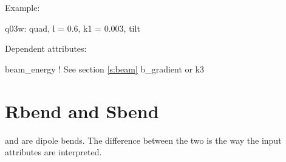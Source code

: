 \vskip0.05in \noindent
Example:
\begin{example}
  q03w: quad, l = 0.6, k1 = 0.003, tilt
\end{example}

\vskip0.05in \noindent
Dependent attributes:
\begin{example}
  beam\_energy  ! See section \ref{s:beam}
  b\_gradient or k3
\end{example}

\section{Rbend and Sbend}
\label{s:bend}

 and  are dipole bends. The difference between
the two is the way the input attributes are interpreted.

